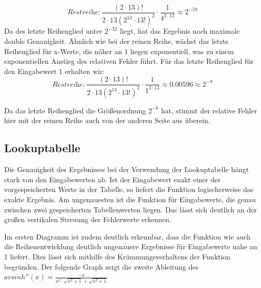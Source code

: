 \documentclass[course=erap] {aspdoc}
\begin{document}
    \[
    \textit{Restreihe}: \frac{(2\cdot13)!}{2\cdot13(2^{13}\cdot 13!)^2} \cdot \frac{1}{4^{2\cdot13}} \approx 2^{-59}
    \]
    Da des letzte Reihenglied unter $2^{-52}$ liegt, hat das Ergebnis noch maximale double Genauigkeit. Ähnlich wie bei der reinen Reihe, wächst das letzte Reihenglied für x-Werte, die näher an 1 liegen exponentiell, was zu einem exponentiellen Anstieg des relativen Fehler führt.
    Für das letzte Reihenglied für den Eingabewert 1 erhalten wir:
    \[
    \textit{Restreihe}: \frac{(2\cdot13)!}{2\cdot13(2^{13}\cdot 13!)^2} \cdot \frac{1}{1^{2\cdot13}} \approx 0.00596 \approx 2^{-8}
    \]

    Da das letzte Reihenglied die Größenordnung $2^{-8}$ hat, stimmt der relative Fehler hier mit der reinen Reihe auch von der anderen Seite aus überein.

    \subsection{Lookuptabelle}
    Die Genauigkeit des Ergebnisses bei der Verwendung der Lookuptabelle hängt stark von den Eingabewerten ab. Ist der Eingabewert exakt einer der vorgespeicherten Werte in der Tabelle, so liefert die Funktion logischerweise das exakte Ergebnis. Am ungenauesten ist die Funktion für Eingabewerte, die genau zwischen zwei gespeicherten Tabellenwerten liegen. Das lässt sich deutlich an der großen vertikalen Streuung der Fehlerwerte erkennen.
    
    Im ersten Diagramm ist zudem deutlich erkennbar, dass die Funktion wie auch die Reihenentwicklung deutlich ungenauere Ergebnisse für Eingabewerte nahe an 1 liefert. Dies lässt sich mithilfe des Krümmungsverhaltens der Funktion begründen. Der folgende Graph zeigt die zweite Ableitung des $arsinh''(x) = \frac{-x}{x^2\cdot \sqrt{x^2+1}+\sqrt{x^2+1}}$

    
\end{document}
